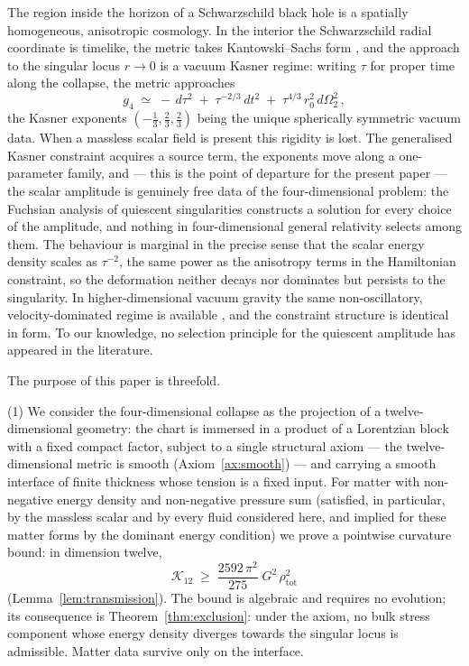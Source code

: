 \documentclass[11pt]{article}
\numberwithin{equation}{section}
\theoremstyle{plain}
\theoremstyle{definition}
\theoremstyle{remark}
\newcommand{\Kr}{\mathcal{K}}
\newcommand{\Geff}{G}
\begin{document}
The region inside the horizon of a Schwarzschild black hole is a
spatially homogeneous, anisotropic cosmology. In the interior the
Schwarzschild radial coordinate is timelike, the metric takes
Kantowski--Sachs form \cite{KantowskiSachs1966}, and the approach to
the singular locus $r \to 0$ is a vacuum Kasner regime: writing $\tau$
for proper time along the collapse, the metric approaches
\begin{equation}\label{eq:kasner4}
g_{4} \;\simeq\; -\,d\tau^{2} \;+\; \tau^{-2/3}\,dt^{2}
\;+\; \tau^{4/3}\, r_{0}^{2}\, d\Omega_{2}^{2}\,,
\end{equation}
the Kasner exponents $(-\tfrac13, \tfrac23, \tfrac23)$ being the unique
spherically symmetric vacuum data. When a massless scalar field is
present this rigidity is lost. The generalised Kasner constraint
acquires a source term, the exponents move along a one-parameter
family, and --- this is the point of departure for the present paper
--- the scalar amplitude is genuinely free data of the
four-dimensional problem: the Fuchsian analysis of quiescent
singularities \cite{AnderssonRendall2001, KichenassamyRendall1998}
constructs a solution for every choice of the amplitude, and nothing
in four-dimensional general relativity selects among them. The
behaviour is marginal in the precise sense that the scalar energy
density scales as $\tau^{-2}$, the same power as the anisotropy terms
in the Hamiltonian constraint, so the deformation neither decays nor
dominates but persists to the singularity. In higher-dimensional
vacuum gravity the same non-oscillatory, velocity-dominated regime is
available \cite{DemaretHenneauxSpindel1985, DamourHenneauxNicolai2003},
and the constraint structure is identical in form. To our knowledge,
no selection principle for the quiescent amplitude has appeared in the
literature.

The purpose of this paper is threefold.

(1) We consider the four-dimensional collapse as the projection of a
twelve-dimensional geometry: the chart is immersed in a product of a
Lorentzian block with a fixed compact factor, subject to a single
structural axiom --- the twelve-dimensional metric is smooth
(Axiom~\ref{ax:smooth}) --- and carrying a smooth interface of finite
thickness whose tension is a fixed input. For matter with
non-negative energy density and non-negative pressure sum (satisfied,
in particular, by the massless scalar and by every fluid considered
here, and implied for these matter forms by the dominant energy
condition) we prove a pointwise curvature bound: in dimension twelve,
\begin{equation}\label{eq:bound-intro}
\Kr_{12} \;\geq\; \frac{2592\,\pi^{2}}{275}\; \Geff^{2}\,
\rho_{\mathrm{tot}}^{2}
\end{equation}
(Lemma~\ref{lem:transmission}). The bound is algebraic and requires no
evolution; its consequence is Theorem~\ref{thm:exclusion}: under the
axiom, no bulk stress component whose energy density diverges towards
the singular locus is admissible. Matter data survive only on the
interface.
\end{document}
